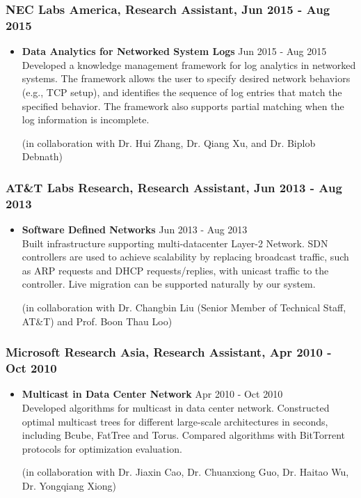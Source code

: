 \subsubsection{NEC Labs America, Research Assistant, Jun 2015 - Aug 2015}
\begin{itemize}
\item {\bf Data Analytics for Networked System Logs} \hfill Jun 2015 - Aug 2015\\
Developed a knowledge management framework for log analytics in networked
systems. The framework allows the user to specify desired network behaviors
(e.g., TCP setup), and identifies the sequence of log entries that match the
specified behavior. The framework also supports partial matching when the log
information is incomplete.

(in collaboration with Dr. Hui Zhang, Dr. Qiang Xu, and Dr. Biplob Debnath)
\end{itemize}


\subsubsection{AT\&T Labs Research, Research Assistant, Jun 2013 - Aug 2013}
\begin{itemize}
\item {\bf Software Defined Networks} \hfill Jun 2013 - Aug 2013\\
Built infrastructure supporting multi-datacenter Layer-2 Network. SDN controllers
are used to achieve scalability by replacing broadcast traffic, such as ARP
requests and DHCP requests/replies, with unicast traffic to the controller. Live
migration can be supported naturally by our system.

(in collaboration with Dr. Changbin Liu (Senior Member of Technical Staff, AT\&T) and Prof. Boon Thau Loo)
\end{itemize}


\subsubsection{Microsoft Research Asia, Research Assistant, Apr 2010 - Oct 2010}
\begin{itemize}
\item {\bf Multicast in Data Center Network} \hfill Apr 2010 - Oct 2010\\
Developed algorithms for multicast in data center network. Constructed optimal
multicast trees for different large-scale architectures in seconds, including
Bcube, FatTree and Torus. Compared algorithms with BitTorrent protocols for
optimization evaluation.

(in collaboration with Dr. Jiaxin Cao, Dr. Chuanxiong Guo, Dr. Haitao Wu, Dr. Yongqiang Xiong)
\end{itemize}

